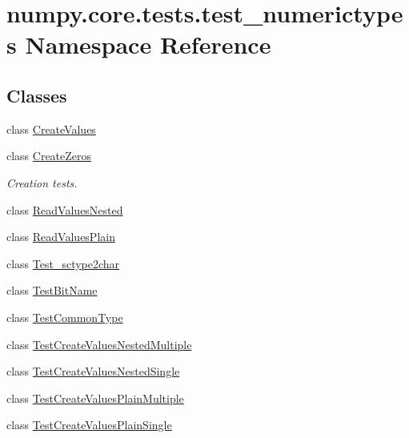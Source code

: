 \hypertarget{namespacenumpy_1_1core_1_1tests_1_1test__numerictypes}{}\section{numpy.\+core.\+tests.\+test\+\_\+numerictypes Namespace Reference}
\label{namespacenumpy_1_1core_1_1tests_1_1test__numerictypes}
\subsection*{Classes}
\begin{DoxyCompactItemize}
\item 
class \hyperlink{classnumpy_1_1core_1_1tests_1_1test__numerictypes_1_1CreateValues}{Create\+Values}
\item 
class \hyperlink{classnumpy_1_1core_1_1tests_1_1test__numerictypes_1_1CreateZeros}{Create\+Zeros}
\begin{DoxyCompactList}\small\item\em Creation tests. \end{DoxyCompactList}\item 
class \hyperlink{classnumpy_1_1core_1_1tests_1_1test__numerictypes_1_1ReadValuesNested}{Read\+Values\+Nested}
\item 
class \hyperlink{classnumpy_1_1core_1_1tests_1_1test__numerictypes_1_1ReadValuesPlain}{Read\+Values\+Plain}
\item 
class \hyperlink{classnumpy_1_1core_1_1tests_1_1test__numerictypes_1_1Test__sctype2char}{Test\+\_\+sctype2char}
\item 
class \hyperlink{classnumpy_1_1core_1_1tests_1_1test__numerictypes_1_1TestBitName}{Test\+Bit\+Name}
\item 
class \hyperlink{classnumpy_1_1core_1_1tests_1_1test__numerictypes_1_1TestCommonType}{Test\+Common\+Type}
\item 
class \hyperlink{classnumpy_1_1core_1_1tests_1_1test__numerictypes_1_1TestCreateValuesNestedMultiple}{Test\+Create\+Values\+Nested\+Multiple}
\item 
class \hyperlink{classnumpy_1_1core_1_1tests_1_1test__numerictypes_1_1TestCreateValuesNestedSingle}{Test\+Create\+Values\+Nested\+Single}
\item 
class \hyperlink{classnumpy_1_1core_1_1tests_1_1test__numerictypes_1_1TestCreateValuesPlainMultiple}{Test\+Create\+Values\+Plain\+Multiple}
\item 
class \hyperlink{classnumpy_1_1core_1_1tests_1_1test__numerictypes_1_1TestCreateValuesPlainSingle}{Test\+Create\+Values\+Plain\+Single}

\end{DoxyCompactItemize}
